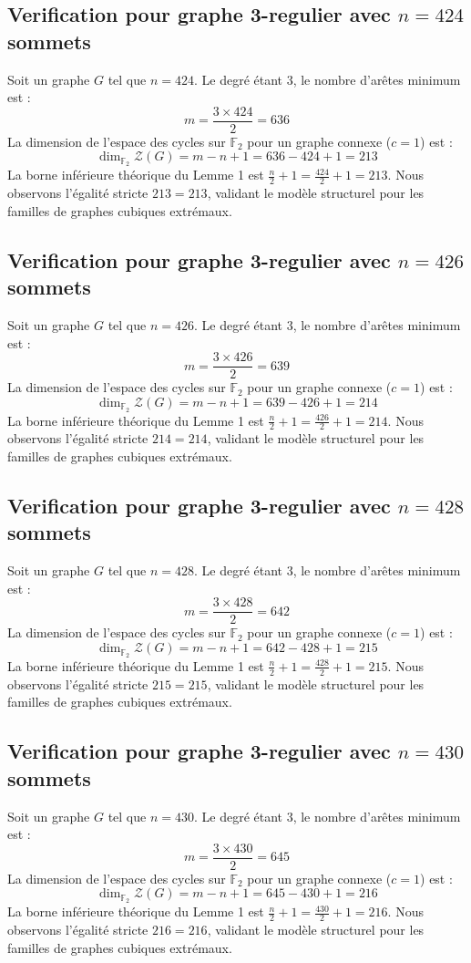 \documentclass[11pt,a4paper]{article}
\begin{document}
\subsection{Verification pour graphe 3-regulier avec $n=424$ sommets}
Soit un graphe $G$ tel que $n = 424$. Le degré étant 3, le nombre d'arêtes minimum est :
$$ m = \frac{3 \times 424}{2} = 636 $$
La dimension de l'espace des cycles sur $\mathbb{F}_2$ pour un graphe connexe ($c=1$) est :
$$ \dim_{\mathbb{F}_2} \mathcal{Z}(G) = m - n + 1 = 636 - 424 + 1 = 213 $$
La borne inférieure théorique du Lemme 1 est $\frac{n}{2} + 1 = \frac{424}{2} + 1 = 213$.
Nous observons l'égalité stricte $213 = 213$, validant le modèle structurel pour les familles de graphes cubiques extrémaux.

\subsection{Verification pour graphe 3-regulier avec $n=426$ sommets}
Soit un graphe $G$ tel que $n = 426$. Le degré étant 3, le nombre d'arêtes minimum est :
$$ m = \frac{3 \times 426}{2} = 639 $$
La dimension de l'espace des cycles sur $\mathbb{F}_2$ pour un graphe connexe ($c=1$) est :
$$ \dim_{\mathbb{F}_2} \mathcal{Z}(G) = m - n + 1 = 639 - 426 + 1 = 214 $$
La borne inférieure théorique du Lemme 1 est $\frac{n}{2} + 1 = \frac{426}{2} + 1 = 214$.
Nous observons l'égalité stricte $214 = 214$, validant le modèle structurel pour les familles de graphes cubiques extrémaux.

\subsection{Verification pour graphe 3-regulier avec $n=428$ sommets}
Soit un graphe $G$ tel que $n = 428$. Le degré étant 3, le nombre d'arêtes minimum est :
$$ m = \frac{3 \times 428}{2} = 642 $$
La dimension de l'espace des cycles sur $\mathbb{F}_2$ pour un graphe connexe ($c=1$) est :
$$ \dim_{\mathbb{F}_2} \mathcal{Z}(G) = m - n + 1 = 642 - 428 + 1 = 215 $$
La borne inférieure théorique du Lemme 1 est $\frac{n}{2} + 1 = \frac{428}{2} + 1 = 215$.
Nous observons l'égalité stricte $215 = 215$, validant le modèle structurel pour les familles de graphes cubiques extrémaux.

\subsection{Verification pour graphe 3-regulier avec $n=430$ sommets}
Soit un graphe $G$ tel que $n = 430$. Le degré étant 3, le nombre d'arêtes minimum est :
$$ m = \frac{3 \times 430}{2} = 645 $$
La dimension de l'espace des cycles sur $\mathbb{F}_2$ pour un graphe connexe ($c=1$) est :
$$ \dim_{\mathbb{F}_2} \mathcal{Z}(G) = m - n + 1 = 645 - 430 + 1 = 216 $$
La borne inférieure théorique du Lemme 1 est $\frac{n}{2} + 1 = \frac{430}{2} + 1 = 216$.
Nous observons l'égalité stricte $216 = 216$, validant le modèle structurel pour les familles de graphes cubiques extrémaux.
\end{document}
